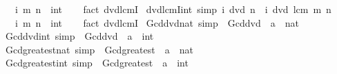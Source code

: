 \begin{isabellebody}
\ \ \ i\ m\ n\ {\isacharcolon}{\kern0pt}{\isacharcolon}{\kern0pt}\ int\isanewline
%
\isadelimproof
\ \ %
\endisadelimproof
%
\isatagproof
{}\isamarkupfalse%
\ {\isacharparenleft}{\kern0pt}fact\ dvd{\isacharunderscore}{\kern0pt}lcmI{}{\isacharparenright}{\kern0pt}%
\endisatagproof
{\isafoldproof}%
%
\isadelimproof
\isanewline
%
\endisadelimproof
\isanewline
{}\isamarkupfalse%
\ dvd{\isacharunderscore}{\kern0pt}lcm{\isacharunderscore}{\kern0pt}I{}{\isacharunderscore}{\kern0pt}int\ {\isacharbrackleft}{\kern0pt}simp{\isacharbrackright}{\kern0pt}{\isacharcolon}{\kern0pt}\ {\isachardoublequoteopen}i\ dvd\ n\ {\isasymLongrightarrow}\ i\ dvd\ lcm\ m\ n{\isachardoublequoteclose}\isanewline
\ \ \ i\ m\ n\ {\isacharcolon}{\kern0pt}{\isacharcolon}{\kern0pt}\ int\isanewline
%
\isadelimproof
\ \ %
\endisadelimproof
%
\isatagproof
{}\isamarkupfalse%
\ {\isacharparenleft}{\kern0pt}fact\ dvd{\isacharunderscore}{\kern0pt}lcmI{}{\isacharparenright}{\kern0pt}%
\endisatagproof
{\isafoldproof}%
%
\isadelimproof
\isanewline
%
\endisadelimproof
\isanewline
{}\isamarkupfalse%
\ Gcd{\isacharunderscore}{\kern0pt}dvd{\isacharunderscore}{\kern0pt}nat\ {\isacharbrackleft}{\kern0pt}simp{\isacharbrackright}{\kern0pt}\ {\isacharequal}{\kern0pt}\ Gcd{\isacharunderscore}{\kern0pt}dvd\ {\isacharbrackleft}{\kern0pt}\ {\isacharquery}{\kern0pt}{\isacharprime}{\kern0pt}a\ {\isacharequal}{\kern0pt}\ nat{\isacharbrackright}{\kern0pt}\isanewline
{}\isamarkupfalse%
\ Gcd{\isacharunderscore}{\kern0pt}dvd{\isacharunderscore}{\kern0pt}int\ {\isacharbrackleft}{\kern0pt}simp{\isacharbrackright}{\kern0pt}\ {\isacharequal}{\kern0pt}\ Gcd{\isacharunderscore}{\kern0pt}dvd\ {\isacharbrackleft}{\kern0pt}\ {\isacharquery}{\kern0pt}{\isacharprime}{\kern0pt}a\ {\isacharequal}{\kern0pt}\ int{\isacharbrackright}{\kern0pt}\isanewline
{}\isamarkupfalse%
\ Gcd{\isacharunderscore}{\kern0pt}greatest{\isacharunderscore}{\kern0pt}nat\ {\isacharbrackleft}{\kern0pt}simp{\isacharbrackright}{\kern0pt}\ {\isacharequal}{\kern0pt}\ Gcd{\isacharunderscore}{\kern0pt}greatest\ {\isacharbrackleft}{\kern0pt}\ {\isacharquery}{\kern0pt}{\isacharprime}{\kern0pt}a\ {\isacharequal}{\kern0pt}\ nat{\isacharbrackright}{\kern0pt}\isanewline
{}\isamarkupfalse%
\ Gcd{\isacharunderscore}{\kern0pt}greatest{\isacharunderscore}{\kern0pt}int\ {\isacharbrackleft}{\kern0pt}simp{\isacharbrackright}{\kern0pt}\ {\isacharequal}{\kern0pt}\ Gcd{\isacharunderscore}{\kern0pt}greatest\ {\isacharbrackleft}{\kern0pt}\ {\isacharquery}{\kern0pt}{\isacharprime}{\kern0pt}a\ {\isacharequal}{\kern0pt}\ int{\isacharbrackright}{\kern0pt}\isanewline

\end{isabellebody}
